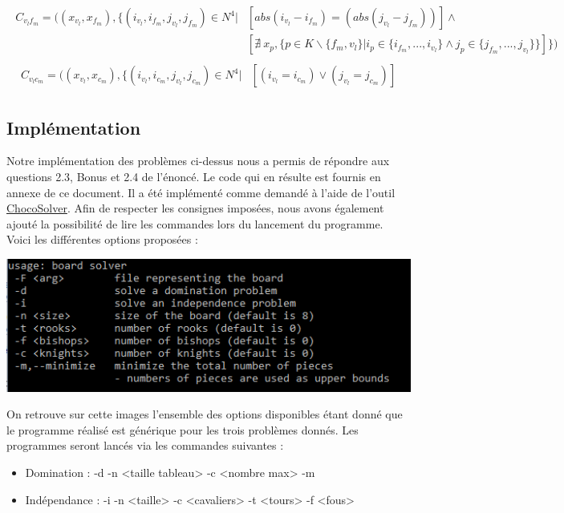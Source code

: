 \documentclass[a4paper]{article}
\begin{document}
\begin{align*}
\begin{split}
C_{v_lf_m} = ( (x_{v_l},x_{f_m}), \{ (i_{v_l},i_{f_m},j_{v_l},j_{f_m}) \in N^4 | &  [ abs(i_{v_l} - i_{f_m}) = (abs(j_{v_l} - j_{f_m})) ] \wedge \\
& [ \nexists \ x_p, \{ p \in K \backslash \{f_m,v_l\} | i_{p} \in \{ i_{f_m},...,i_{v_l} \} \wedge j_p \in \{ j_{f_m},...,j_{v_l} \}\}  ]  \} )
\end{split}
\end{align*}
\begin{align*}
\begin{split}
C_{v_lc_m} = ( (x_{v_l},x_{c_m}), \{ (i_{v_l},i_{c_m},j_{v_l},j_{c_m}) \in N^4 | &  [ (i_{v_l} = i_{c_m}) \vee(j_{v_l} = j_{c_m}) ]
\end{split}
\end{align*}

\subsection{Implémentation}
Notre implémentation des problèmes ci-dessus nous a permis de répondre aux questions 2.3, Bonus et 2.4 de l'énoncé. Le code qui en résulte est fournis en annexe de ce document. Il a été implémenté comme demandé à l'aide de l'outil \href{http://www.choco-solver.org/}{ChocoSolver}.
Afin de respecter les consignes imposées, nous avons également ajouté la possibilité de lire les commandes lors du lancement du programme. Voici les différentes options proposées : 
\begin{center}
\includegraphics[scale=0.7]{image.png}
\end{center}
On retrouve sur cette images l'ensemble des options disponibles étant donné que le programme réalisé est générique pour les trois problèmes donnés. Les programmes seront lancés via les commandes suivantes : 
\begin{itemize}
\item Domination : -d -n <taille tableau> -c <nombre max> -m
\item Indépendance : -i -n <taille> -c <cavaliers> -t <tours> -f <fous>
\end{itemize}
\end{document}
